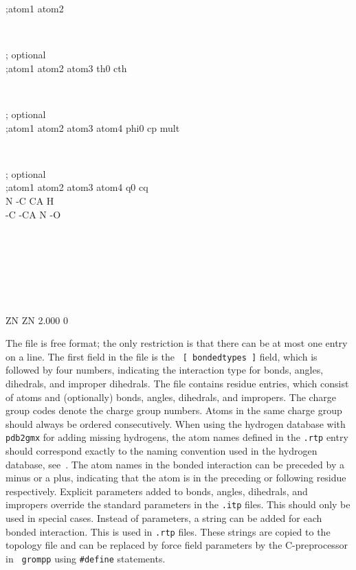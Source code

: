 \begin{small}
\begin{tt}
;atom1 atom2\\
\end{tt}\\
\begin{tt}
 [ angles ]  ; optional\\
;atom1 atom2 atom3    th0    cth\\
\end{tt}\\
\begin{tt}
 [ dihedrals ]  ; optional\\
;atom1 atom2 atom3 atom4   phi0     cp   mult\\
\end{tt}\\
\begin{tt}
 [ impropers ]  ; optional\\
;atom1 atom2 atom3 atom4     q0     cq\\
     N    -C    CA     H\\
    -C   -CA     N    -O\\
\end{tt}\\
\begin{tt}
[ ZN ]\\
\end{tt}\\
\begin{tt}
 [ atoms ]\\
    ZN    ZN   2.000     0\\
\end{tt}
\end{small}

The file is free format; the only restriction is that there can be at
most one entry on a line.  The first field in the file is the {\tt
[~bondedtypes~]} field, which is followed by four numbers,
indicating the interaction type for bonds, angles, dihedrals, and
improper dihedrals.  The file contains residue entries, which consist
of atoms and (optionally) bonds, angles, dihedrals, and impropers.  The
charge group codes denote the charge group numbers. Atoms in the same
charge group should always be ordered consecutively. When using the
hydrogen database with {\tt pdb2gmx} for adding missing hydrogens, the
atom names defined in the {\tt .rtp} entry should correspond exactly
to the naming convention used in the hydrogen database,
see~. The atom names in the bonded interaction can be
preceded by a minus or a plus, indicating that the atom is in the
preceding or following residue respectively.  Explicit parameters added
to bonds, angles, dihedrals, and impropers override
the standard parameters in the {\tt .itp} files.  This should only be
used in special cases. Instead of parameters, a string can be added
for each bonded interaction.  This is used in  {\tt .rtp}
files. These strings are copied to the topology file and can be
replaced by force field parameters by the C-preprocessor in {\tt
grompp} using {\tt \#define} statements.

